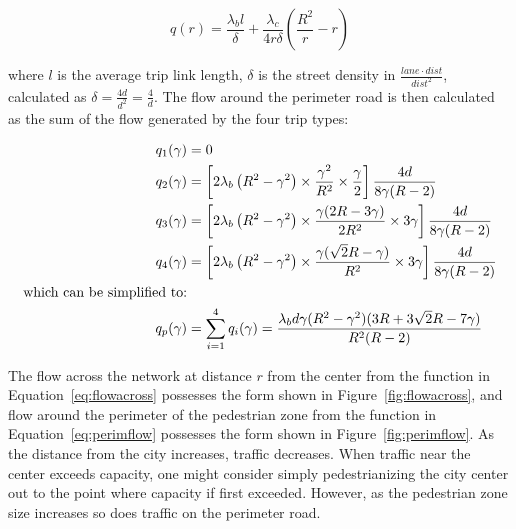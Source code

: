 \documentclass{article}
\begin{document}
\begin{equation}
    q(r) = \frac{\lambda_b l}{\delta} + \frac{\lambda_c}{4r\delta} \left( \frac{R^2}{r} - r \right)
    \label{eq:flowacross}
\end{equation}

\noindent where $l$ is the average trip link length, $\delta$ is the street density in $\frac{lane \cdot dist}{dist^2}$, calculated as $\delta = \frac{4d}{d^2} = \frac{4}{d}$. The flow around the perimeter road is then calculated as the sum of the flow generated by the four trip types:

\begin{subequations}
\begin{align}
	q_1(\gamma) &= 0 \\
	q_2(\gamma) &= \left[2 \lambda_b \left(R^2 - \gamma^2\right) \times \frac{\gamma^2}{R^2} \times\frac{\gamma}{2}\right] \frac{4d}{8\gamma (R-2)}\\
	q_3(\gamma) &= \left[2 \lambda_b \left(R^2 - \gamma^2\right) \times \frac{\gamma (2R - 3\gamma)}{2R^2} \times  3\gamma\right] \frac{4d}{8\gamma (R-2)}\\
	q_4(\gamma) &= \left[2 \lambda_b \left(R^2 - \gamma^2\right) \times \frac{\gamma (\sqrt{2}R-\gamma)}{R^2} \times  3\gamma\right] \frac{4d}{8\gamma (R-2)}\\
	\notag\text{which can be simplified to:} & \\
	    q_p(\gamma) & = \sum\limits_{i=1}^4 q_i(\gamma) = \frac{\lambda_b d \gamma (R^2 - \gamma^2) (3R + 3\sqrt{2}R - 7\gamma)}{R^2(R-2)}
    \label{eq:perimflow}
\end{align}
\end{subequations}

\noindent The flow across the network at distance $r$ from the center from the function in Equation~\eqref{eq:flowacross} possesses the form shown in Figure~\ref{fig:flowacross}, and flow around the perimeter of the pedestrian zone from the function in Equation~\eqref{eq:perimflow} possesses the form shown in Figure~\ref{fig:perimflow}. As the distance from the city increases, traffic decreases. When traffic near the center exceeds capacity, one might consider simply pedestrianizing the city center out to the point where capacity if first exceeded. However, as the pedestrian zone size increases so does traffic on the perimeter road. 
\end{document}

